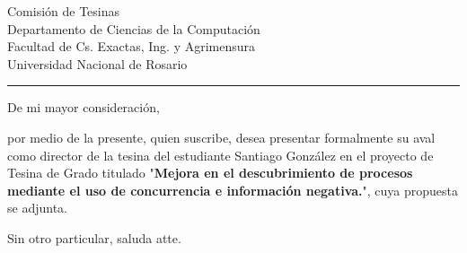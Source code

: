 \documentclass{letter}
\date{Rosario, \today}
\begin{document}
\begin{letter}{Comisi\'on de Tesinas \\ Departamento de Ciencias de la Computaci\'on \\ Facultad de Cs. Exactas, Ing. y Agrimensura \\ Universidad Nacional de Rosario\\ \rule{7.5cm}{0.1pt}}
\opening{De mi mayor consideraci\'on, }
\setlength{\parindent}{4em}
\setlength{\parskip}{1em}

por medio de la presente, quien suscribe, desea presentar formalmente su aval como director de la tesina del estudiante Santiago Gonz\'alez en el proyecto de Tesina de Grado titulado
"\textbf{Mejora en el descubrimiento de procesos mediante el uso de concurrencia e informaci\'on negativa.}", cuya propuesta se adjunta.

\closing{Sin otro particular, saluda atte.}
\end{letter}
\end{document}
